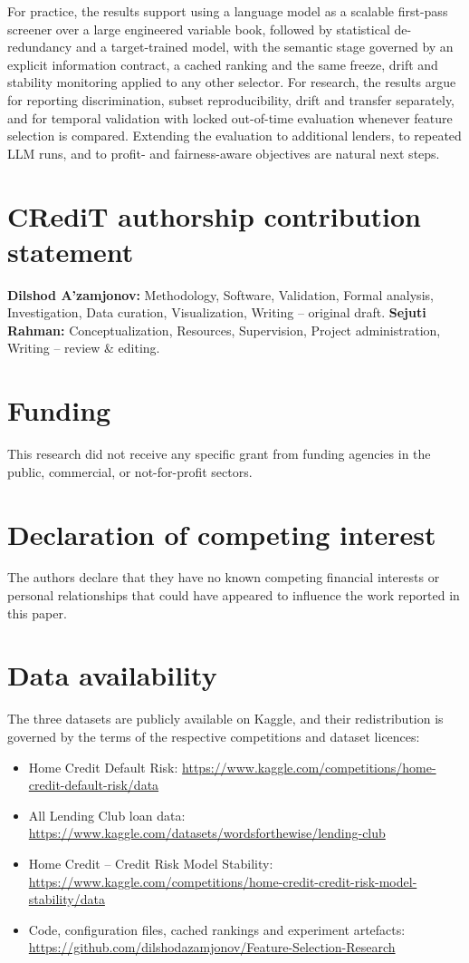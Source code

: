 \documentclass[preprint,12pt]{elsarticle}
\begin{document}
For practice, the results support using a language model as a scalable first-pass screener over a large engineered variable book, followed by statistical de-redundancy and a target-trained model, with the semantic stage governed by an explicit information contract, a cached ranking and the same freeze, drift and stability monitoring applied to any other selector. For research, the results argue for reporting discrimination, subset reproducibility, drift and transfer separately, and for temporal validation with locked out-of-time evaluation whenever feature selection is compared. Extending the evaluation to additional lenders, to repeated LLM runs, and to profit- and fairness-aware objectives are natural next steps.


\section*{CRediT authorship contribution statement}
\textbf{Dilshod A'zamjonov:} Methodology, Software, Validation, Formal analysis, Investigation, Data curation, Visualization, Writing -- original draft. \textbf{Sejuti Rahman:} Conceptualization, Resources, Supervision, Project administration, Writing -- review \& editing.

\section*{Funding}
This research did not receive any specific grant from funding agencies in the public, commercial, or not-for-profit sectors.

\section*{Declaration of competing interest}
The authors declare that they have no known competing financial interests or personal relationships that could have appeared to influence the work reported in this paper.

\section*{Data availability}
The three datasets are publicly available on Kaggle, and their redistribution is governed by the terms of the respective competitions and dataset licences:
\begin{itemize}
    \item Home Credit Default Risk: \url{https://www.kaggle.com/competitions/home-credit-default-risk/data}
    \item All Lending Club loan data: \url{https://www.kaggle.com/datasets/wordsforthewise/lending-club}
    \item Home Credit -- Credit Risk Model Stability: \url{https://www.kaggle.com/competitions/home-credit-credit-risk-model-stability/data}
    \item Code, configuration files, cached rankings and experiment artefacts: \url{https://github.com/dilshodazamjonov/Feature-Selection-Research}
\end{itemize}
\end{document}
